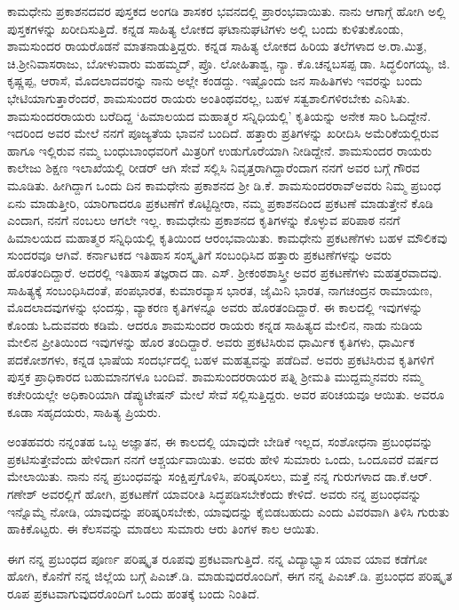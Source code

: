 ಕಾಮಧೇನು ಪ್ರಕಾಶನದವರ ಪುಸ್ತಕದ ಅಂಗಡಿ ಶಾಸಕರ ಭವನದಲ್ಲಿ ಪ್ರಾರಂಭವಾಯಿತು. ನಾನು ಆಗಾಗ್ಗೆ ಹೋಗಿ ಅಲ್ಲಿ ಪುಸ್ತಕಗಳನ್ನು ಖರೀದಿಸುತ್ತಿದೆ. ಕನ್ನಡ ಸಾಹಿತ್ಯ ಲೋಕದ ಘಟಾನುಘಟಿಗಳು ಅಲ್ಲಿ ಬಂದು ಕುಳಿತುಕೊಂಡು, ಶಾಮಸುಂದರ ರಾಯರೊಡನೆ ಮಾತನಾಡುತ್ತಿದ್ದರು. ಕನ್ನಡ ಸಾಹಿತ್ಯ ಲೋಕದ ಹಿರಿಯ ತಲೆಗಳಾದ ಅ.ರಾ.ಮಿತ್ರ, ಚಿ.ಶ‍್ರೀನಿವಾಸರಾಜು, ಬೋಳುವಾರು ಮಹಮ್ಮದ್​, ಪ್ರೊ. ಲೋಹಿತಾಶ್ವ, ನ್ಯಾ. ಕೊ.ಚನ್ನಬಸಪ್ಪ ಡಾ. ಸಿದ್ಧಲಿಂಗಯ್ಯ, ಜಿ. ಕೃಷ್ಣಪ್ಪ, ಆರಾಸೆ, ಮೊದಲಾದವರನ್ನು ನಾನು ಅಲ್ಲೇ ಕಂಡದ್ದು. ಇಷ್ಟೊಂದು ಜನ ಸಾಹಿತಿಗಳು ಇವರನ್ನು ಬಂದು ಭೇಟಿಯಾಗುತ್ತಾರೆಂದರೆ, ಶಾಮಸುಂದರ ರಾಯರು ಅಂತಿಂಥವರಲ್ಲ, ಬಹಳ ಸತ್ವಶಾಲಿಗಳಿರಬೇಕು ಎನಿಸಿತು. ಶಾಮಸುಂದರರಾಯರು ಬರೆದಿದ್ದ ‘ಹಿಮಾಲಯದ ಮಹಾತ್ಮರ ಸನ್ನಿಧಿಯಲ್ಲಿ’ ಕೃತಿಯನ್ನು ಅನೇಕ ಸಾರಿ ಓದಿದ್ದೇನೆ. ಇದರಿಂದ ಅವರ ಮೇಲೆ ನನಗೆ ಪೂಜ್ಯತೆಯ ಭಾವನೆ ಬಂದಿದೆ. ಹತ್ತಾರು ಪ್ರತಿಗಳನ್ನು ಖರೀದಿಸಿ ಅಮೆರಿಕೆಯಲ್ಲಿರುವ ಹಾಗೂ ಇಲ್ಲಿರುವ ನಮ್ಮ ಬಂಧುಬಾಂಧವರಿಗೆ ಮಿತ್ರರಿಗೆ ಉಡುಗೊರೆಯಾಗಿ ನೀಡಿದ್ದೇನೆ. ಶಾಮಸುಂದರ ರಾಯರು ಕಾಲೇಜು ಶಿಕ್ಷಣ ಇಲಾಖೆಯಲ್ಲಿ ರೀಡರ್​ ಆಗಿ ಸೇವೆ ಸಲ್ಲಿಸಿ ನಿವೃತ್ತರಾಗಿದ್ದಾರೆಂದಾಗ ನನಗೆ ಅವರ ಬಗ್ಗೆ ಗೌರವ ಮೂಡಿತು. ಹೀಗಿದ್ದಾಗ ಒಂದು ದಿನ ಕಾಮಧೇನು ಪ್ರಕಾಶನದ ಶ‍್ರೀ ಡಿ.ಕೆ. ಶಾಮಸುಂದರರಾವ್​ ಅವರು ನಿಮ್ಮ ಪ್ರಬಂಧ ಏನು ಮಾಡುತ್ತೀರಿ, ಯಾರಿಗಾದರೂ ಪ್ರಕಟಣೆಗೆ ಕೊಟ್ಟಿದ್ದೀರಾ, ನಮ್ಮ ಪ್ರಕಾಶನದಿಂದ ಪ್ರಕಟಣೆ ಮಾಡುತ್ತೇನೆ ಕೊಡಿ ಎಂದಾಗ, ನನಗೆ ನಂಬಲು ಆಗಲೇ ಇಲ್ಲ. ಕಾಮಧೇನು ಪ್ರಕಾಶನದ ಕೃತಿಗಳನ್ನು ಕೊಳ್ಳುವ ಪರಿಪಾಠ ನನಗೆ ಹಿಮಾಲಯದ ಮಹಾತ್ಮರ ಸನ್ನಿಧಿಯಲ್ಲಿ ಕೃತಿಯಿಂದ ಆರಂಭವಾಯಿತು. ಕಾಮಧೇನು ಪ್ರಕಟಣೆಗಳು ಬಹಳ ಮೌಲಿಕವು ಸುಂದರವೂ ಆಗಿವೆ. ಕರ್ನಾಟಕದ ಇತಿಹಾಸ ಸಂಸ್ಕೃತಿಗೆ ಸಂಬಂಧಿಸಿದ ಹತ್ತಾರು ಪ್ರಕಟಣೆಗಳನ್ನು ಅವರು ಹೊರತಂದಿದ್ದಾರೆ. ಅದರಲ್ಲಿ ಇತಿಹಾಸ ತಜ್ಞರಾದ ಡಾ. ಎಸ್​. ಶ‍್ರೀಕಂಠಶಾಸ್ತ್ರೀ ಅವರ ಪ್ರಕಟಣೆಗಳು ಮಹತ್ತರವಾದವು. ಸಾಹಿತ್ಯಕ್ಕೆ ಸಂಬಂಧಿಸಿದಂತೆ, ಪಂಪಭಾರತ, ಕುಮಾರವ್ಯಾಸ ಭಾರತ, ಜೈಮಿನಿ ಭಾರತ, ನಾಗಚಂದ್ರನ ರಾಮಾಯಣ, ಮೊದಲಾದವುಗಳನ್ನು ಛಂದಸ್ಸು, ವ್ಯಾಕರಣ ಕೃತಿಗಳನ್ನೂ ಅವರು ಹೊರತಂದಿದ್ದಾರೆ. ಈ ಕಾಲದಲ್ಲಿ ಇವುಗಳನ್ನು ಕೊಂಡು ಓದುವವರು ಕಡಿಮೆ. ಆದರೂ ಶಾಮಸುಂದರ ರಾಯರು ಕನ್ನಡ ಸಾಹಿತ್ಯದ ಮೇಲಿನ, ನಾಡು ನುಡಿಯ ಮೇಲಿನ ಪ್ರೀತಿಯಿಂದ ಇವುಗಳನ್ನು ಹೊರ ತಂದಿದ್ದಾರೆ. ಅವರು ಪ್ರಕಟಿಸಿರುವ ಧಾರ್ಮಿಕ ಕೃತಿಗಳು, ಧಾರ್ಮಿಕ ಪದಕೋಶಗಳು, ಕನ್ನಡ ಭಾಷೆಯ ಸಂದರ್ಭದಲ್ಲಿ ಬಹಳ ಮಹತ್ವವನ್ನು ಪಡೆದಿವೆ. ಅವರು ಪ್ರಕಟಿಸಿರುವ ಕೃತಿಗಳಿಗೆ ಪುಸ್ತಕ ಪ್ರಾಧಿಕಾರದ ಬಹುಮಾನಗಳೂ ಬಂದಿವೆ. ಶಾಮಸುಂದರರಾಯರ ಪತ್ನಿ ಶ‍್ರೀಮತಿ ಮುದ್ದಮ್ಮನವರು ನಮ್ಮ ಕಚೇರಿಯಲ್ಲೇ ಅಧಿಕಾರಿಯಾಗಿ ಡೆಪ್ಯುಟೇಷನ್​ ಮೇಲೆ ಸೇವೆ ಸಲ್ಲಿಸುತ್ತಿದ್ದರು. ಅವರ ಪರಿಚಯವೂ ಆಯಿತು. ಅವರೂ ಕೂಡಾ ಸಹೃದಯರು, ಸಾಹಿತ್ಯ ಪ್ರಿಯರು. 

ಅಂತಹವರು ನನ್ನಂತಹ ಒಬ್ಬ ಅಜ್ಞಾತನ, ಈ ಕಾಲದಲ್ಲಿ ಯಾವುದೇ ಬೇಡಿಕೆ ಇಲ್ಲದ, ಸಂಶೋಧನಾ ಪ್ರಬಂಧವನ್ನು ಪ್ರಕಟಿಸುತ್ತೇವೆಂದು ಹೇಳಿದಾಗ ನನಗೆ ಆಶ್ಚರ್ಯವಾಯಿತು. ಅವರು ಹೇಳಿ ಸುಮಾರು ಒಂದು, ಒಂದೂವರೆ ವರ್ಷದ ಮೇಲಾಯಿತು. ನಾನು ನನ್ನ ಪ್ರಬಂಧವನ್ನು ಸಂಕ್ಷಿಪ್ತಗೊಳಿಸಿ, ಪರಿಷ್ಕರಿಸಲು, ಮತ್ತೆ ನನ್ನ ಗುರುಗಳಾದ ಡಾ.ಕೆ.ಆರ್​. ಗಣೇಶ್​ ಅವರಲ್ಲಿಗೆ ಹೋಗಿ, ಪ್ರಕಟಣೆಗೆ ಯಾವರೀತಿ ಸಿದ್ಧಪಡಿಸಬೇಕೆಂದು ಕೇಳಿದೆ. ಅವರು ನನ್ನ ಪ್ರಬಂಧವನ್ನು ಇನ್ನೊಮ್ಮೆ ನೋಡಿ, ಯಾವುದನ್ನು ಪರಿಷ್ಕರಿಸಬೇಕು, ಯಾವುದನ್ನು ಕೈಬಿಡಬಹುದು ಎಂದು ವಿವರವಾಗಿ ತಿಳಿಸಿ ಗುರುತು ಹಾಕಿಕೊಟ್ಟರು. ಈ ಕೆಲಸವನ್ನು ಮಾಡಲು ಸುಮಾರು ಆರು ತಿಂಗಳ ಕಾಲ ಆಯಿತು. 

ಈಗ ನನ್ನ ಪ್ರಬಂಧದ ಪೂರ್ಣ ಪರಿಷ್ಕೃತ ರೂಪವು ಪ್ರಕಟವಾಗುತ್ತಿದೆ. ನನ್ನ ವಿದ್ಯಾಭ್ಯಾಸ ಯಾವ ಯಾವ ಕಡೆಗೋ ಹೋಗಿ, ಕೊನೆಗೆ ನನ್ನ ಜಿಲ್ಲೆಯ ಬಗ್ಗೆ ಪಿಎಚ್​.ಡಿ. ಮಾಡುವುದರೊಂದಿಗೆ, ಈಗ ನನ್ನ ಪಿಎಚ್​.ಡಿ. ಪ್ರಬಂಧದ ಪರಿಷ್ಕೃತ ರೂಪ ಪ್ರಕಟವಾಗುವುದರೊಂದಿಗೆ ಒಂದು ಹಂತಕ್ಕೆ ಬಂದು ನಿಂತಿದೆ. 

